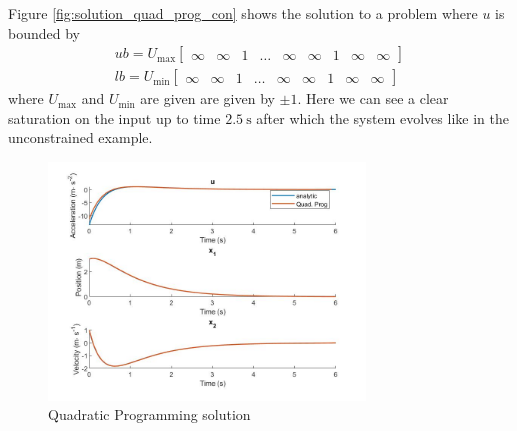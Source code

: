 \par Figure \ref{fig:solution_quad_prog_con} shows the solution to a problem where $u$ is bounded by
\begin{equation}
\label{eq:quad_prog_ineq_constr}
\begin{gathered}
    ub = U_{\text{max}} \begin{bmatrix} \infty & \infty & 1 & \ldots & \infty & \infty & 1 & \infty & \infty \end{bmatrix} \\
    lb = U_{\text{min}} \begin{bmatrix} \infty & \infty & 1 & \ldots & \infty & \infty & 1 & \infty & \infty \end{bmatrix} 
\end{gathered}
\end{equation}
where $U_{\text{max}}$ and $U_{\text{min}}$ are given are given by $\pm 1$. Here we can see a clear saturation on the input up to time $\SI{2.5}{\second}$ after which the system evolves like in the unconstrained example.

\begin{figure}[h!]
\centering
\includegraphics[width=0.75\textwidth]{Images/quad_prog_unconstrained.jpg}
\caption{Quadratic Programming solution}
\label{fig:solution_quad_prog_un}
\end{figure}



